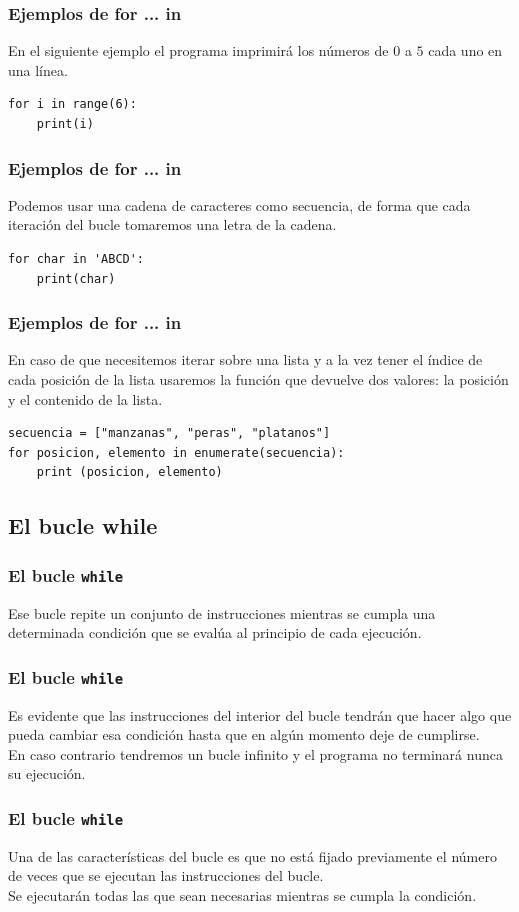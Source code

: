\begin{frame}[fragile]
\frametitle{Ejemplos de for ... in}
En el siguiente ejemplo el programa imprimirá los números de $0$ a $5$ cada uno en una línea.
\pause
\begin{lstlisting}
for i in range(6):
    print(i)
\end{lstlisting}
\end{frame}
\begin{frame}[fragile]
\frametitle{Ejemplos de for ... in}
Podemos usar una cadena de caracteres como secuencia, de forma que cada iteración del bucle tomaremos una letra de la cadena.
\pause
\begin{lstlisting}
for char in 'ABCD':
    print(char)
\end{lstlisting}
\end{frame}
\begin{frame}[fragile]
\frametitle{Ejemplos de for ... in}
En caso de que necesitemos iterar sobre una lista y a la vez tener el índice de cada posición de la lista usaremos la función  que devuelve dos valores: la posición y el contenido de la lista.
\pause
\begin{lstlisting}
secuencia = ["manzanas", "peras", "platanos"]
for posicion, elemento in enumerate(secuencia):
    print (posicion, elemento)
\end{lstlisting}
\end{frame}
\subsection{El bucle while}
\begin{frame}
\frametitle{El bucle \texttt{while}}
Ese bucle repite un conjunto de instrucciones mientras se cumpla una determinada condición que se evalúa al principio de cada ejecución.
\end{frame}
\begin{frame}
\frametitle{El bucle \texttt{while}}
Es evidente que las instrucciones del interior del bucle tendrán que hacer algo que pueda cambiar esa condición hasta que en algún momento deje de cumplirse.
\\
\bigskip
En caso contrario tendremos un bucle infinito y el programa no terminará nunca su ejecución.
\end{frame}
\begin{frame}
\frametitle{El bucle \texttt{while}}
Una de las características del bucle  es que no está fijado previamente el número de veces que se ejecutan las instrucciones del bucle.
\\
\bigskip
Se ejecutarán todas las que sean necesarias mientras se cumpla la condición.
\end{frame}

